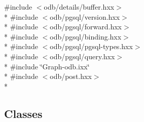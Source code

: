 {\ttfamily \#include $<$odb/details/buffer.\+hxx$>$}\\*
{\ttfamily \#include $<$odb/pgsql/version.\+hxx$>$}\\*
{\ttfamily \#include $<$odb/pgsql/forward.\+hxx$>$}\\*
{\ttfamily \#include $<$odb/pgsql/binding.\+hxx$>$}\\*
{\ttfamily \#include $<$odb/pgsql/pgsql-\/types.\+hxx$>$}\\*
{\ttfamily \#include $<$odb/pgsql/query.\+hxx$>$}\\*
{\ttfamily \#include \char`\"{}Graph-\/odb.\+ixx\char`\"{}}\\*
{\ttfamily \#include $<$odb/post.\+hxx$>$}\\*
\subsection*{Classes}
